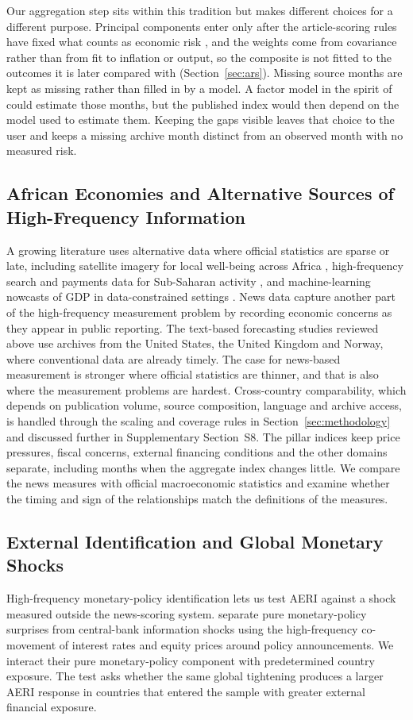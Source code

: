 \documentclass[12pt]{article}
\begin{document}
Our aggregation step sits within this tradition but makes different choices for a different purpose. Principal components enter only after the article-scoring rules have fixed what counts as economic risk \citep{gentzkow2019,jolliffe2016}, and the weights come from covariance rather than from fit to inflation or output, so the composite is not fitted to the outcomes it is later compared with (Section~\ref{sec:ars}). Missing source months are kept as missing rather than filled in by a model. A factor model in the spirit of \citet{banbura2014} could estimate those months, but the published index would then depend on the model used to estimate them. Keeping the gaps visible leaves that choice to the user and keeps a missing archive month distinct from an observed month with no measured risk.


\subsection{African Economies and Alternative Sources of High-Frequency Information}

A growing literature uses alternative data where official statistics are sparse or late, including satellite imagery for local well-being across Africa \citep{yeh2020}, high-frequency search and payments data for Sub-Saharan activity \citep{buell2021}, and machine-learning nowcasts of GDP in data-constrained settings \citep{fotopoulou2026}. News data capture another part of the high-frequency measurement problem by recording economic concerns as they appear in public reporting. The text-based forecasting studies reviewed above use archives from the United States, the United Kingdom and Norway, where conventional data are already timely. The case for news-based measurement is stronger where official statistics are thinner, and that is also where the measurement problems are hardest. Cross-country comparability, which depends on publication volume, source composition, language and archive access, is handled through the scaling and coverage rules in Section~\ref{sec:methodology} and discussed further in Supplementary Section~S8. The pillar indices keep price pressures, fiscal concerns, external financing conditions and the other domains separate, including months when the aggregate index changes little. We compare the news measures with official macroeconomic statistics and examine whether the timing and sign of the relationships match the definitions of the measures.
\subsection{External Identification and Global Monetary Shocks}\label{sec:literature_external_id}
High-frequency monetary-policy identification lets us test AERI against a shock measured outside the news-scoring system. \citet{jarocinski2020} separate pure monetary-policy surprises from central-bank information shocks using the high-frequency co-movement of interest rates and equity prices around policy announcements. We interact their pure monetary-policy component with predetermined country exposure. The test asks whether the same global tightening produces a larger AERI response in countries that entered the sample with greater external financial exposure.
\end{document}
